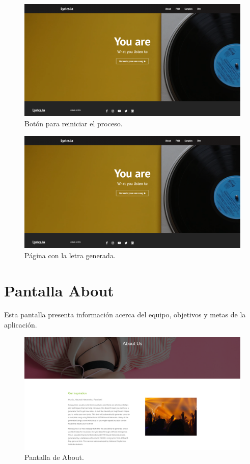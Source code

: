 \documentclass[12pt, a4paper, titlepage]{article}
\begin{document}
\begin{itemize}
		\begin{figure}[H] 
			\includegraphics[width=13.5cm]{./Imagenes/Capturas/x.png}
			\centering \caption{Botón para reiniciar el proceso.}
		\end{figure}
	\end{itemize}

	\begin{figure}[H] 
		\includegraphics[width=13.5cm]{./Imagenes/Capturas/x.png}
		\centering \caption{Página con la letra generada.}
	\end{figure}

		\section{Pantalla About}
		Esta pantalla presenta información acerca del equipo, objetivos y metas de la aplicación.
		
		\begin{figure}[H] 
			\includegraphics[width=13.5cm]{./Imagenes/Capturas/pabout.png}
			\centering \caption{Pantalla de About.}
		\end{figure}
	
\end{document}
